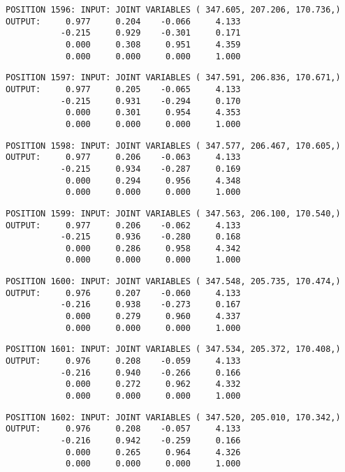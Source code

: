 \begin{verbatim}
POSITION 1596: INPUT: JOINT VARIABLES ( 347.605, 207.206, 170.736,)
OUTPUT:     0.977     0.204    -0.066     4.133
           -0.215     0.929    -0.301     0.171
            0.000     0.308     0.951     4.359
            0.000     0.000     0.000     1.000
\end{verbatim} \pagebreak[1]\begin{verbatim}
POSITION 1597: INPUT: JOINT VARIABLES ( 347.591, 206.836, 170.671,)
OUTPUT:     0.977     0.205    -0.065     4.133
           -0.215     0.931    -0.294     0.170
            0.000     0.301     0.954     4.353
            0.000     0.000     0.000     1.000
\end{verbatim} \pagebreak[1]\begin{verbatim}
POSITION 1598: INPUT: JOINT VARIABLES ( 347.577, 206.467, 170.605,)
OUTPUT:     0.977     0.206    -0.063     4.133
           -0.215     0.934    -0.287     0.169
            0.000     0.294     0.956     4.348
            0.000     0.000     0.000     1.000
\end{verbatim} \pagebreak[1]\begin{verbatim}
POSITION 1599: INPUT: JOINT VARIABLES ( 347.563, 206.100, 170.540,)
OUTPUT:     0.977     0.206    -0.062     4.133
           -0.215     0.936    -0.280     0.168
            0.000     0.286     0.958     4.342
            0.000     0.000     0.000     1.000
\end{verbatim} \pagebreak[1]\begin{verbatim}
POSITION 1600: INPUT: JOINT VARIABLES ( 347.548, 205.735, 170.474,)
OUTPUT:     0.976     0.207    -0.060     4.133
           -0.216     0.938    -0.273     0.167
            0.000     0.279     0.960     4.337
            0.000     0.000     0.000     1.000
\end{verbatim} \pagebreak[1]\begin{verbatim}
POSITION 1601: INPUT: JOINT VARIABLES ( 347.534, 205.372, 170.408,)
OUTPUT:     0.976     0.208    -0.059     4.133
           -0.216     0.940    -0.266     0.166
            0.000     0.272     0.962     4.332
            0.000     0.000     0.000     1.000
\end{verbatim} \pagebreak[1]\begin{verbatim}
POSITION 1602: INPUT: JOINT VARIABLES ( 347.520, 205.010, 170.342,)
OUTPUT:     0.976     0.208    -0.057     4.133
           -0.216     0.942    -0.259     0.166
            0.000     0.265     0.964     4.326
            0.000     0.000     0.000     1.000
\end{verbatim} \pagebreak[1]\begin{verbatim}

\end{verbatim}
